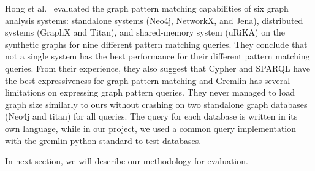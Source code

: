 Hong et al.~\cite{hong2016evaluation} evaluated the graph pattern matching capabilities of six graph analysis systems: standalone systems (Neo4j, NetworkX, and Jena), distributed systems (GraphX and Titan), and shared-memory system (uRiKA) on the synthetic graphs for nine different pattern matching queries. They conclude that not a single system has the best performance for their different pattern matching queries. From their experience, they also suggest that Cypher and SPARQL have the best expressiveness for graph pattern matching and Gremlin has several limitations on expressing graph pattern queries. They never managed to load graph size similarly to ours without crashing on two standalone graph databases (Neo4j and titan) for all queries. The query for each database is written in its own language, while in our project, we used a common query implementation with the gremlin-python standard to test databases. 

In next section, we will describe our methodology for evaluation. 
